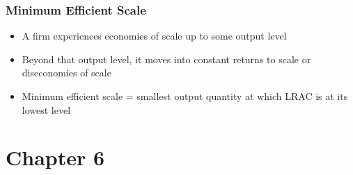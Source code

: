 \documentclass[11pt]{article}
\begin{document}
\subsubsection{Minimum Efficient Scale}
\label{sec:orge58e5be}
\begin{itemize}
\item A firm experiences economies of scale up to some output level
\item Beyond that output level, it moves into constant returns to scale or diseconomies of scale
\item Minimum efficient scale = smallest output quantity at which LRAC is at its lowest level
\end{itemize}
\section{Chapter 6}
\label{sec:org29ac092}
\end{document}
